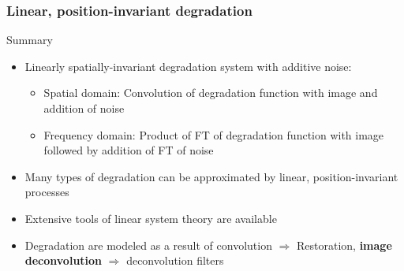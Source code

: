 \documentclass{beamer}
\begin{document}
\begin{frame}
\frametitle{Linear, position-invariant degradation}
\begin{block}{Summary}
\begin{itemize}
\item Linearly spatially-invariant degradation system with additive noise: 
	\begin{itemize}
	\item Spatial domain: Convolution of degradation function with image and addition of noise
	\item Frequency domain: Product of FT of degradation function with image followed by addition of FT of noise
	\end{itemize}
\item Many types of degradation can be approximated by linear, position-invariant processes
\item Extensive tools of linear system theory are available
\item Degradation are modeled as a result of convolution $\Rightarrow$ Restoration, \textbf{image deconvolution} $\Rightarrow$ deconvolution filters
\end{itemize}
\end{block}
\end{frame}
\end{document}
